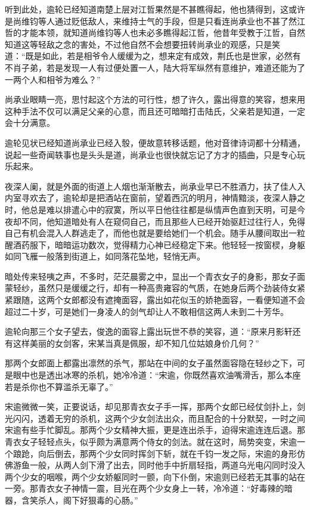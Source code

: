 听到此处，逾轮已经知道南楚上层对江哲果然是不甚瞧得起，他也猜得到，这或许是尚维钧等人通过贬低敌人，来维持士气的手段，但是只看连尚承业也不甚了然江哲的才能本领，就知道尚维钧等人也未必多瞧得起江哲，他昔年受教于江哲，自然知道这等轻敌之念的害处，不过他自然不会想要扭转尚承业的观感，只是笑道：“既是如此，若是相爷令人缓缓为之，想来定有成效，荆氏也是世家，必然有不肖子弟，若是发现一人有过便处置一人，陆大将军纵然有意维护，难道还能为了一两个人和相爷为难么？”

尚承业眼睛一亮，思忖起这个方法的可行性，想了许久，露出得意的笑容，想来用这种手法不仅可以满足父亲的心意，而且还可暗暗打击陆氏，父亲若是知道，一定会十分满意。

逾轮见状已经知道尚承业已经入彀，便故意转移话题，他对音律诗词都十分精通，说起一些奇闻轶事也是头头是道，尚承业也很快就忘记了方才的插曲，只是专心玩乐起来。

夜深人阑，就是外面的街道上人烟也渐渐散去，尚承业早已不胜酒力，扶了佳人入内室寻欢去了，逾轮却是把酒站在窗前，望着西沉的明月，神情黯淡，夜深人静之时，他总是难以排遣心中的寂寞，所以平日他往往都是纵情声色直到天明，可是今夜却不同，他知道暗处有人在窥伺自己，而且那些人已经开始驱赶过往行人，免得自己有机会混入人群逃走了，而他也就是要给她们一个机会。随手从腰间取出一粒醒酒药服下，暗暗运功数次，觉得精力心神已经稳定下来。他轻轻一按窗棂，身躯如同飞雁一般落到街道上，如同落花坠地，轻悄无声。

暗处传来轻咦之声，不多时，茫茫晨雾之中，显出一个青衣女子的身影，那女子面蒙轻纱，虽然只是缓缓之行，却有一种高贵雍容的气质，在她身后两个劲装侍女紧紧跟随，这两个女郎都没有遮掩面容，露出如花似玉的娇艳面容，一看便知道不会超过二十岁，可是她们一身凌人的剑气却让人不敢相信这两人未到二十芳华。

逾轮向那三个女子望去，俊逸的面容上露出玩世不恭的笑容，道：“原来月影轩还有这样美丽的女剑客，宋某当真是佩服，却不知几位姑娘身价几何？”

那两个女郎面上都露出凛然的杀气，那站在中间的女子虽然面容隐在轻纱之下，可是眼中也是透出冰寒的杀机，她冷冷道：“宋逾，你既然喜欢油嘴滑舌，那么本座若是杀你也不算滥杀无辜了。”

宋逾微微一笑，正要说话，却见那青衣女子手一挥，那两个女郎已经仗剑扑上，剑光闪闪，透着无穷的杀机，这两个少女剑法出众，而且配合的十分默契，一时之间宋逾有些手忙脚乱。那两个少女精神大振，更是连出杀手，迫得宋逾连连后退。那青衣女子轻轻点头，似乎颇为满意两个侍女的剑法。就在这时，局势突变，宋逾一个踉跄，向后倒去，那两个少女同时挥剑下斩，就在千钧一发之际，宋逾的身形仿佛游鱼一般，从两人剑下滑了出去，同时他手中折扇轻指，两道乌光电闪同时没入两个少女的咽喉，两个少女娇躯同时一颤，向下仆倒，宋逾则已经若无其事的站在一旁。那青衣女子神情一震，目光在两个少女身上一转，冷冷道：“好毒辣的暗器，含笑杀人，阁下好狠毒的心肠。”

